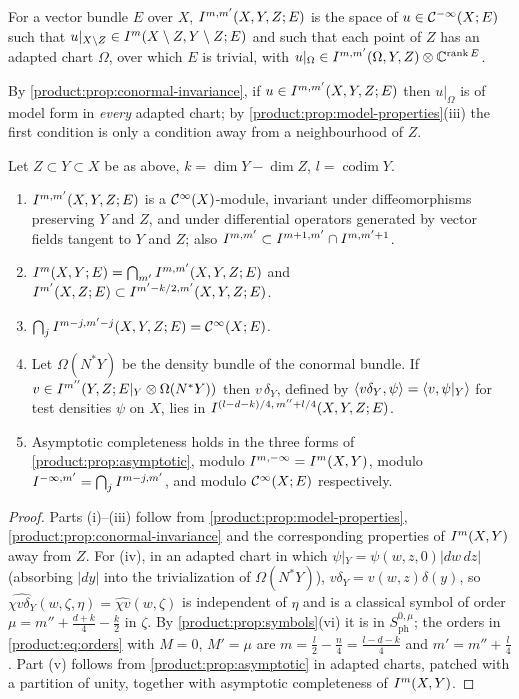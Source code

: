 \begin{definition}\label{product:def:conormal}
For a vector bundle $E$ over $X$, $I^{m,m'}(X,Y,Z;E)$ is the space of
$u\in\mathcal{C}^{-\infty}(X;E)$ such that $u|_{X\setminus Z}\in I^{m}(X\setminus Z,Y\setminus Z;E)$
and such that each point of $Z$ has an adapted chart $\Omega$, over which $E$ is
trivial, with $u|_\Omega\in I^{m,m'}(\Omega,Y,Z)\otimes\mathbb{C}^{\operatorname{rank}E}$.
\end{definition}

By \cref{product:prop:conormal-invariance}, if $u\in I^{m,m'}(X,Y,Z;E)$ then
$u|_\Omega$ is of model form in \emph{every} adapted chart; by
\cref{product:prop:model-properties}(iii) the first condition is only a condition
away from a neighbourhood of $Z$.

\begin{proposition}\label{product:prop:conormal-props}
Let $Z\subset Y\subset X$ be as above, $k=\dim Y-\dim Z$, $l=\operatorname{codim}Y$.
\begin{enumerate}[label=\textup{(\roman*)}]
\item $I^{m,m'}(X,Y,Z;E)$ is a $\mathcal{C}^\infty(X)$-module, invariant under diffeomorphisms
preserving $Y$ and $Z$, and under differential operators generated by vector
fields tangent to $Y$ and $Z$; also $I^{m,m'}\subset I^{m+1,m'}\cap I^{m,m'+1}$.
\item $I^{m}(X,Y;E)=\bigcap_{m'}I^{m,m'}(X,Y,Z;E)$ and
$I^{m'}(X,Z;E)\subset I^{m'-k/2,m'}(X,Y,Z;E)$.
\item $\bigcap_jI^{m-j,m'-j}(X,Y,Z;E)=\mathcal{C}^\infty(X;E)$.
\item Let $\Omega(N^*Y)$ be the density bundle of the conormal bundle. If
$v\in I^{m''}(Y,Z;E|_Y\otimes\Omega(N^*Y))$ then $v\,\delta_Y$, defined by
$\langle v\delta_Y, \psi\rangle=\langle v, \psi|_Y\rangle$ for test densities $\psi$ on $X$, lies in
$I^{(l-d-k)/4,\,m''+l/4}(X,Y,Z;E)$.
\item Asymptotic completeness holds in the three forms of
\cref{product:prop:asymptotic}, modulo $I^{m,-\infty}=I^{m}(X,Y)$, modulo
$I^{-\infty,m'}=\bigcap_jI^{m-j,m'}$, and modulo $\mathcal{C}^\infty(X;E)$ respectively.
\end{enumerate}
\end{proposition}

\begin{proof}
Parts (i)--(iii) follow from \cref{product:prop:model-properties},
\cref{product:prop:conormal-invariance} and the corresponding properties of
$I^{m}(X,Y)$ away from $Z$. For (iv), in an adapted chart in which
$\psi|_Y=\psi(w,z,0)|dw\,dz|$ (absorbing $|dy|$ into the trivialization of
$\Omega(N^*Y)$), $v\delta_Y=v(w,z)\delta(y)$, so
$\widehat{\chi v\delta_Y}(w,\zeta,\eta)=\widehat{\chi v}(w,\zeta)$ is independent of
$\eta$ and is a classical symbol of order
$\mu=m''+\frac{d+k}4-\frac k2$ in $\zeta$. By \cref{product:prop:symbols}(vi) it is
in $S^{0,\mu}_{\mathrm{ph}}$; the orders in \eqref{product:eq:orders} with $M=0$,
$M'=\mu$ are $m=\frac l2-\frac n4=\frac{l-d-k}4$ and $m'=m''+\frac l4$. Part (v)
follows from \cref{product:prop:asymptotic} in adapted charts, patched with a
partition of unity, together with asymptotic completeness of $I^{m}(X,Y)$.
\end{proof}

